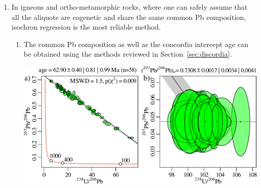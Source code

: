 \begin{refsection}
\begin{enumerate}
\item In igneous and ortho-metamorphic rocks, where one can safely
  assume that all the aliquots are cogenetic and share the same common
  Pb composition, isochron regression is the most reliable method.
  \begin{enumerate}
  \item The common Pb composition as well as the concordia intercept
    age can be obtained using the methods reviewed in
    Section~\ref{sec:discordia}.\\
    
    \noindent\begin{minipage}[t]{\linewidth}
    \centering
    \includegraphics[width=.8\textwidth]{../figures/commonPbisochron13.pdf}
    \end{minipage}
    \begin{minipage}[t]{\linewidth}
      \centering
      \captionsetup{width=.8\textwidth}
    \label{fig:commonPbisochron13}
    \end{minipage}


\end{enumerate}
\end{enumerate}
\end{refsection}
